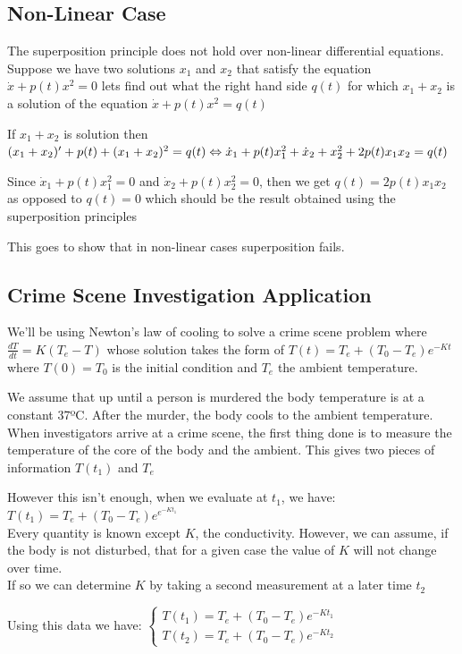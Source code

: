 \documentclass[11pt, openright]{book}
\begin{document}
\subsection{Non-Linear Case}

The superposition principle does not hold over non-linear differential equations. Suppose we have two solutions $x_1$ and $x_2$ that satisfy the equation $\dot{x}+p(t)x^2=0$ lets find out what the right hand side $q(t)$ for which $x_1+x_2$ is a solution of the equation $\dot{x}+p(t)x^2=q(t)$

If $x_1+x_2$ is solution then $(x_1+x_2)'+p(t)+(x_1+x_2)^2=q(t) \Leftrightarrow \dot{x}_1 +p(t)x_1^2+\dot{x}_2+x_{2}^2+2p(t)x_1x_2=q(t)$

Since $\dot{x}_1+p(t)x_{1}^2=0$ and $\dot{x}_2+p(t)x_{2}^2=0$, then we get $q(t)=2p(t)x_1x_2$ as opposed to $q(t)=0$ which should be the result obtained using the superposition principles

This goes to show that in non-linear cases superposition fails.

\newpage

\subsection{Crime Scene Investigation Application}

We'll be using Newton's law of cooling to solve a crime scene problem where $\frac{dT}{dt}=K(T_e-T)$ whose solution takes the form of $T(t)=T_e+(T_0-T_e)e^{-Kt}$ where $T(0)=T_0$ is the initial condition and $T_e$ the ambient temperature.

We assume that up until a person is murdered the body temperature is at a constant 37ºC. After the murder, the body cools to the ambient temperature. When investigators arrive at a crime scene, the first thing done is to measure the temperature of the core of the body and the ambient. This gives two pieces of information $T(t_1)$ and $T_e$

However this isn't enough, when we evaluate at $t_1$, we have: $T(t_1)=T_e+(T_0-T_e)e^{e^{-Kt_1}}$\\
Every quantity is known except $K$, the conductivity. However, we can assume, if the body is not disturbed, that for a given case the value of $K$ will not change over time.\\
If so we can determine $K$ by taking a second measurement at a later time $t_2$

Using this data we have: $\begin{cases}
        T(t_1)=T_e+(T_0-T_e)e^{-Kt_1} \\
        T(t_2)=T_e+(T_0-T_e)e^{-Kt_2}
    \end{cases}$
\end{document}
